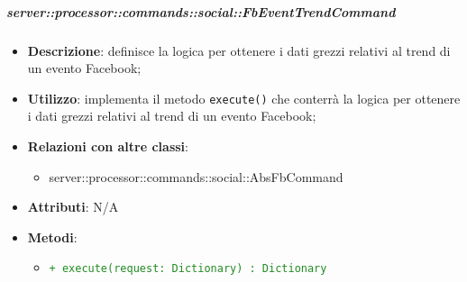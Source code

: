         \subparagraph{server::processor::commands::social::FbEventTrendCommand} %
        \label{subp:bdsm_app_server_processor_commands_social_fbeventtrendcommand}
        \begin{itemize}
          \item \textbf{Descrizione}: definisce la logica per ottenere i dati grezzi relativi al trend di un evento Facebook;
          \item \textbf{Utilizzo}: implementa il metodo \texttt{execute()} che conterrà la logica per ottenere i dati grezzi relativi al trend di un evento Facebook;
          \item \textbf{Relazioni con altre classi}:
            \begin{itemize}
              \item server::processor::commands::social::AbsFbCommand
            \end{itemize}
            \item \textbf{Attributi}: N/A
            \item \textbf{Metodi}:
            \begin{itemize}
                \item \textcolor{forestgreen}{\texttt{+ execute(request: Dictionary) : Dictionary}}
            \end{itemize}
        \end{itemize}

